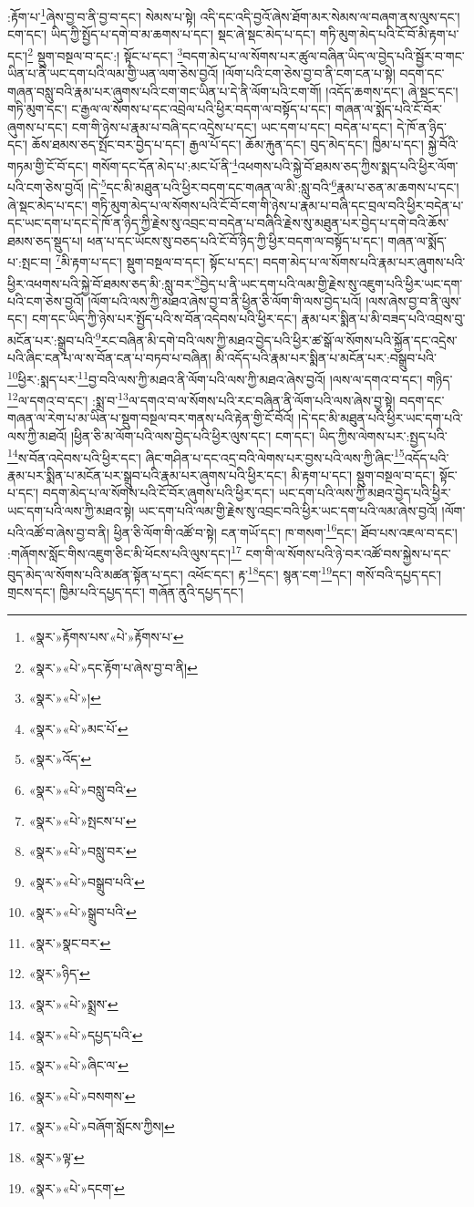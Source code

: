 :རྟོག་པ་\footnote{«སྣར་»རྟོགས་པས་«པེ་»རྟོགས་པ་}ཞེས་བྱ་བ་ནི་བྱ་བ་དང་། སེམས་པ་སྟེ། འདི་དང་འདི་བྱའོ་ཞེས་ཐོག་མར་སེམས་ལ་བཞག་ནས་ལུས་དང་། ངག་དང་། ཡིད་ཀྱི་སྤྱོད་པ་དགེ་བ་མ་ཆགས་པ་དང་། སྡང་ཞེ་སྡང་མེད་པ་དང་། གཏི་མུག་མེད་པའི་ངོ་བོ་མི་རྟག་པ་དང་།\footnote{«སྣར་»«པེ་»དང་རྟོག་པ་ཞེས་བྱ་བ་ནི།} སྡུག་བསྔལ་བ་དང་:། སྟོང་པ་དང་། \footnote{«སྣར་»«པེ་»།  }བདག་མེད་པ་ལ་སོགས་པར་ཚུལ་བཞིན་ཡིད་ལ་བྱེད་པའི་སྦྱོར་བ་གང་ཡིན་པ་ནི་ཡང་དག་པའི་ལམ་གྱི་ཡན་ལག་ཅེས་བྱའོ། །ལོག་པའི་ངག་ཅེས་བྱ་བ་ནི་ངག་ངན་པ་སྟེ། བདག་དང་གཞན་བསླུ་བའི་རྣམ་པར་ཞུགས་པའི་ངག་གང་ཡིན་པ་དེ་ནི་ལོག་པའི་ངག་གོ། །འདོད་ཆགས་དང་། ཞེ་སྡང་དང་། གཏི་མུག་དང་། ང་རྒྱལ་ལ་སོགས་པ་དང་འབྲེལ་པའི་ཕྱིར་བདག་ལ་བསྟོད་པ་དང་། གཞན་ལ་སྨོད་པའི་ངོ་བོར་ཞུགས་པ་དང་། ངག་གི་ཉེས་པ་རྣམ་པ་བཞི་དང་འདྲེས་པ་དང་། ཡང་དག་པ་དང་། བདེན་པ་དང་། དེ་ཁོ་ན་ཉིད་དང་། ཆོས་ཐམས་ཅད་སྤོང་བར་བྱེད་པ་དང་། རྒྱལ་པོ་དང་། ཆོམ་རྐུན་དང་། བུད་མེད་དང་། ཁྱིམ་པ་དང་། སྐྱེ་བོའི་གཏམ་གྱི་ངོ་བོ་དང་། གསོག་དང་དོན་མེད་པ་:མང་པོ་ནི་\footnote{«སྣར་»«པེ་»མང་པོ་}འཕགས་པའི་སྐྱེ་བོ་ཐམས་ཅད་ཀྱིས་སྨད་པའི་ཕྱིར་ལོག་པའི་ངག་ཅེས་བྱའོ། །དེ་\footnote{«སྣར་»འོད་}དང་མི་མཐུན་པའི་ཕྱིར་བདག་དང་གཞན་ལ་མི་:སླུ་བའི་\footnote{«སྣར་»«པེ་»བསླུ་བའི་}རྣམ་པ་ཅན་མ་ཆགས་པ་དང་། ཞེ་སྡང་མེད་པ་དང་། གཏི་མུག་མེད་པ་ལ་སོགས་པའི་ངོ་བོ་ངག་གི་ཉེས་པ་རྣམ་པ་བཞི་དང་བྲལ་བའི་ཕྱིར་བདེན་པ་དང་ཡང་དག་པ་དང་དེ་ཁོ་ན་ཉིད་ཀྱི་རྗེས་སུ་འབྲང་བ་བདེན་པ་བཞིའི་རྗེས་སུ་མཐུན་པར་བྱེད་པ་དགེ་བའི་ཆོས་ཐམས་ཅད་སྡུད་པ། ཕན་པ་དང་ཡོངས་སུ་བཅད་པའི་ངོ་བོ་ཉིད་ཀྱི་ཕྱིར་བདག་ལ་བསྟོད་པ་དང་། གཞན་ལ་སྨོད་པ་:སྤང་བ། \footnote{«སྣར་»«པེ་»སྤངས་པ་}མི་རྟག་པ་དང་། སྡུག་བསྔལ་བ་དང་། སྟོང་པ་དང་། བདག་མེད་པ་ལ་སོགས་པའི་རྣམ་པར་ཞུགས་པའི་ཕྱིར་འཕགས་པའི་སྐྱེ་བོ་ཐམས་ཅད་མི་:སླུ་བར་\footnote{«སྣར་»«པེ་»བསླུ་བར་}བྱེད་པ་ནི་ཡང་དག་པའི་ལམ་གྱི་རྗེས་སུ་འཇུག་པའི་ཕྱིར་ཡང་དག་པའི་ངག་ཅེས་བྱའོ། །ལོག་པའི་ལས་ཀྱི་མཐའ་ཞེས་བྱ་བ་ནི་ཕྱིན་ཅི་ལོག་གི་ལས་བྱེད་པའོ། །ལས་ཞེས་བྱ་བ་ནི་ལུས་དང་། ངག་དང་ཡིད་ཀྱི་ཉེས་པར་སྤྱོད་པའི་ས་བོན་འདེབས་པའི་ཕྱིར་དང་། རྣམ་པར་སྨིན་པ་མི་བཟད་པའི་འབྲས་བུ་མངོན་པར་:སྒྲུབ་པའི་\footnote{«སྣར་»«པེ་»བསྒྲུབ་པའི་}རང་བཞིན་མི་དགེ་བའི་ལས་ཀྱི་མཐའ་བྱེད་པའི་ཕྱིར་ཚ་སྒོ་ལ་སོགས་པའི་སྐྱོན་དང་འདྲེས་པའི་ཞིང་ངན་པ་ལ་ས་བོན་ངན་པ་བཏབ་པ་བཞིན། མི་འདོད་པའི་རྣམ་པར་སྨིན་པ་མངོན་པར་:བསྒྲུབ་པའི་\footnote{«སྣར་»«པེ་»སྒྲུབ་པའི་}ཕྱིར་:སྨད་པར་\footnote{«སྣར་»སྣང་བར་}བྱ་བའི་ལས་ཀྱི་མཐའ་ནི་ལོག་པའི་ལས་ཀྱི་མཐའ་ཞེས་བྱའོ། །ལས་ལ་དགའ་བ་དང་། གཉིད་\footnote{«སྣར་»ཉིད་}ལ་དགའ་བ་དང་། :སྨྲ་བ་\footnote{«སྣར་»«པེ་»སྨྲས་}ལ་དགའ་བ་ལ་སོགས་པའི་རང་བཞིན་ནི་ལོག་པའི་ལས་ཞེས་བྱ་སྟེ། བདག་དང་གཞན་ལ་རེག་པ་མ་ཡིན་པ་སྡུག་བསྔལ་བར་གནས་པའི་རྟེན་གྱི་ངོ་བོའོ། །དེ་དང་མི་མཐུན་པའི་ཕྱིར་ཡང་དག་པའི་ལས་ཀྱི་མཐའོ། །ཕྱིན་ཅི་མ་ལོག་པའི་ལས་བྱེད་པའི་ཕྱིར་ལུས་དང་། ངག་དང་། ཡིད་ཀྱིས་ལེགས་པར་:སྤྱད་པའི་\footnote{«སྣར་»«པེ་»དཔྱད་པའི་}ས་བོན་འདེབས་པའི་ཕྱིར་དང་། ཞིང་གཤིན་པ་དང་འདྲ་བའི་ལེགས་པར་བྱས་པའི་ལས་ཀྱི་ཞིང་\footnote{«སྣར་»«པེ་»ཞིང་ལ་}འདོད་པའི་རྣམ་པར་སྨིན་པ་མངོན་པར་སྒྲུབ་པའི་རྣམ་པར་ཞུགས་པའི་ཕྱིར་དང་། མི་རྟག་པ་དང་། སྡུག་བསྔལ་བ་དང་། སྟོང་པ་དང་། བདག་མེད་པ་ལ་སོགས་པའི་ངོ་བོར་ཞུགས་པའི་ཕྱིར་དང་། ཡང་དག་པའི་ལས་ཀྱི་མཐའ་བྱེད་པའི་ཕྱིར་ཡང་དག་པའི་ལས་ཀྱི་མཐའ་སྟེ། ཡང་དག་པའི་ལམ་གྱི་རྗེས་སུ་འབྲང་བའི་ཕྱིར་ཡང་དག་པའི་ལམ་ཞེས་བྱའོ། །ལོག་པའི་འཚོ་བ་ཞེས་བྱ་བ་ནི། ཕྱིན་ཅི་ལོག་གི་འཚོ་བ་སྟེ། ངན་གཡོ་དང་། ཁ་གསག་\footnote{«སྣར་»«པེ་»བསགས་}དང་། ཐོབ་པས་འཇལ་བ་དང་། :གཞོགས་སློང་གིས་འཇུག་ཅིང་མི་ཕོངས་པའི་ལུས་དང་།\footnote{«སྣར་»«པེ་»བཞོག་སློངས་ཀྱིས།} ངག་གི་ལ་སོགས་པའི་ཉེ་བར་འཚོ་བས་སྐྱེས་པ་དང་བུད་མེད་ལ་སོགས་པའི་མཚན་སྟོན་པ་དང་། འཕོང་དང་། རྟ་\footnote{«སྣར་»ལྟ་}དང་། སྙན་ངག་\footnote{«སྣར་»«པེ་»དངག་}དང་། གསོ་བའི་དཔྱད་དང་། གྲངས་དང་། ཁྱིམ་པའི་དཔྱད་དང་། གཞོན་ནུའི་དཔྱད་དང་། 